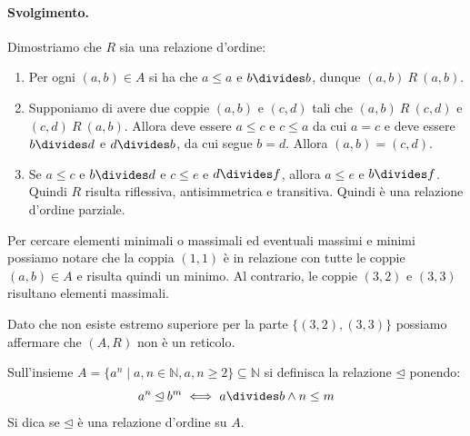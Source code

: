 \paragraph{Svolgimento.} Dimostriamo che $R$ sia una relazione d'ordine:
\begin{enumerate}
	\item Per ogni $(a,b) \in A$ si ha che $a \leq a$ e $b \divides b$, dunque $(a,b) \ R \ (a,b)$.
	\item Supponiamo di avere due coppie $(a,b)$ e $(c,d)$ tali che $(a,b) \ R \ (c,d)$ e $(c,d) \ R \ (a,b)$. Allora deve essere $a \leq c$ e $c \leq a$ da cui $a =c$ e deve essere $b \divides d$ e $d \divides b$, da cui segue $b=d$. Allora $(a,b)=(c,d)$.
	\item Se $a \leq c$ e $b \divides d$ e $c \leq e$ e $d \divides f$, allora $a \leq e$ e $b \divides f$. Quindi $R$ risulta riflessiva, antisimmetrica e transitiva. Quindi è una relazione d'ordine parziale.
\end{enumerate}
Per cercare elementi minimali o massimali ed eventuali massimi e minimi possiamo notare che la coppia $(1,1)$ è in relazione con tutte le coppie $(a,b) \in A$ e risulta quindi un minimo. Al contrario, le coppie $(3,2)$ e $(3,3)$ risultano elementi massimali. 
\begin{center}
\end{center}
Dato che non esiste estremo superiore per la parte $\{(3,2),(3,3)\}$ possiamo affermare che $(A,R)$ non è un reticolo. \hfill \blacksquare
\begin{exsbox}
	Sull'insieme $A=\{a^{n} \; | \; a,n \in \mathbb{N},a,n \geq 2\} \subseteq \mathbb{N}$ si definisca la relazione $\unlhd$ ponendo:
	\begin{displaymath}
		a^{n} \unlhd b^{m} \iff a \divides b \land n \leq m
	\end{displaymath}
	Si dica se $\unlhd$ è una relazione d'ordine su $A$.
\end{exsbox}
